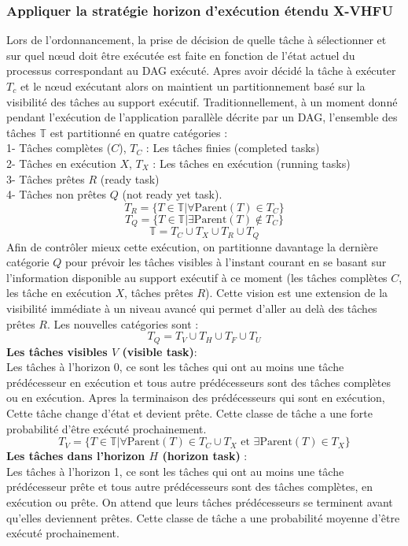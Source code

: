 \subsubsection{Appliquer la stratégie horizon d'exécution étendu X-VHFU}
%
Lors de l'ordonnancement, la prise de décision de quelle tâche à sélectionner et sur quel nœud doit être exécutée est faite en fonction de l'état actuel du processus correspondant au DAG exécuté. 
%
Apres avoir décidé la tâche à exécuter $T_c$ et le nœud exécutant alors on maintient un partitionnement basé sur la visibilité des tâches au support exécutif. 
Traditionnellement, à un moment donné pendant l'exécution de l'application parallèle décrite par un DAG, l'ensemble des tâches $\mathbb{T}$ est partitionné en quatre catégories :\\
1- Tâches complètes ($C$),  $ T_C$ : Les tâches finies (completed tasks)\\
2- Tâches en exécution $X$, $ T_X$ :  Les tâches en exécution (running tasks)\\
3- Tâches prêtes $R$ (ready task) \\
4- Tâches non prêtes $Q$ (not ready yet task).
%
$$ 
T_R = \{ T \in \mathbb{T} |\forall \text{Parent}(T) \in T_C \}
$$
$$
T_Q = \{ T \in \mathbb{T} | \exists \text{Parent}(T) \notin T_C \}
$$
$$
\mathbb{T} = T_C \cup T_X \cup T_R \cup T_Q
$$
%
Afin de contrôler mieux cette exécution, on partitionne davantage la dernière catégorie $Q$ pour prévoir les tâches visibles à l'instant courant en se basant sur l'information disponible au support exécutif à ce moment (les tâches complètes $C$, les tâche en exécution $X$, tâches prêtes $R$). Cette vision est une extension de la visibilité immédiate à un niveau avancé qui permet d'aller au delà des tâches prêtes $R$. Les nouvelles catégories sont :
%
$$
T_Q = T_V \cup T_H \cup T_F \cup T_U
$$
%
\textbf{Les tâches visibles  $V$ (visible task)}:\\
Les tâches à l'horizon 0, ce sont les tâches qui ont au moins une tâche prédécesseur en exécution et tous autre prédécesseurs sont des tâches  complètes ou en exécution. Apres la terminaison des prédécesseurs qui sont en exécution, Cette tâche change d'état et devient prête. Cette classe de tâche a une forte probabilité d'être exécuté prochainement. 
%
$$
T_V  = \{ T \in \mathbb{T} | \forall \text{Parent}(T) \in T_C \cup T_X \text{ et } \exists \text{Parent}(T) \in T_X \}
$$
% 
\textbf{Les tâches dans l'horizon $H$ (horizon task)} : \\
Les tâches à l'horizon 1, ce sont les tâches qui ont au moins une tâche prédécesseur prête et tous autre prédécesseurs sont des tâches  complètes, en exécution ou prête. On attend que leurs tâches prédécesseurs se terminent avant qu'elles deviennent prêtes. Cette classe de tâche a une probabilité moyenne d'être exécuté prochainement. 

